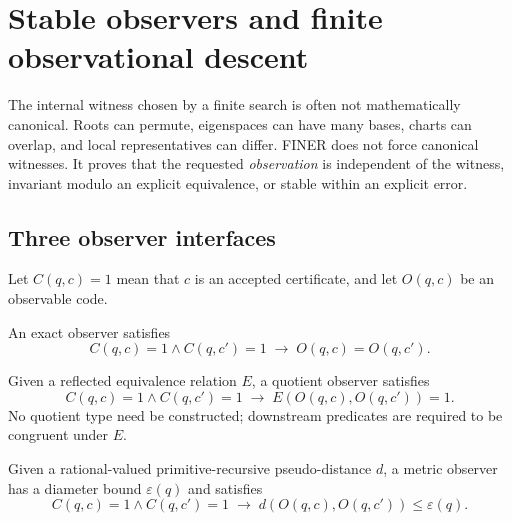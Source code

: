 \section{Stable observers and finite observational descent}
\label{sec:observational-descent}

The internal witness chosen by a finite search is often not mathematically canonical.  Roots can permute, eigenspaces can have many bases, charts can overlap, and local representatives can differ.  FINER does not force canonical witnesses.  It proves that the requested \emph{observation} is independent of the witness, invariant modulo an explicit equivalence, or stable within an explicit error.

\subsection{Three observer interfaces}

Let \(C(q,c)=1\) mean that \(c\) is an accepted certificate, and let \(O(q,c)\) be an observable code.

\begin{definition}
An exact observer satisfies
\begin{equation}
 C(q,c)=1\wedge C(q,c')=1
 \;\to\;
 O(q,c)=O(q,c').
 \label{eq:exact-observer}
\end{equation}
\end{definition}

\begin{definition}
Given a reflected equivalence relation \(E\), a quotient observer satisfies
\begin{equation}
 C(q,c)=1\wedge C(q,c')=1
 \;\to\;
 E(O(q,c),O(q,c'))=1.
 \label{eq:quotient-observer}
\end{equation}
No quotient type need be constructed; downstream predicates are required to be congruent under \(E\).
\end{definition}

\begin{definition}
Given a rational-valued primitive-recursive pseudo-distance \(d\), a metric observer has a diameter bound \(\varepsilon(q)\) and satisfies
\begin{equation}
 C(q,c)=1\wedge C(q,c')=1
 \;\to\;
 d(O(q,c),O(q,c'))\leq\varepsilon(q).
 \label{eq:metric-observer}
\end{equation}
\end{definition}


